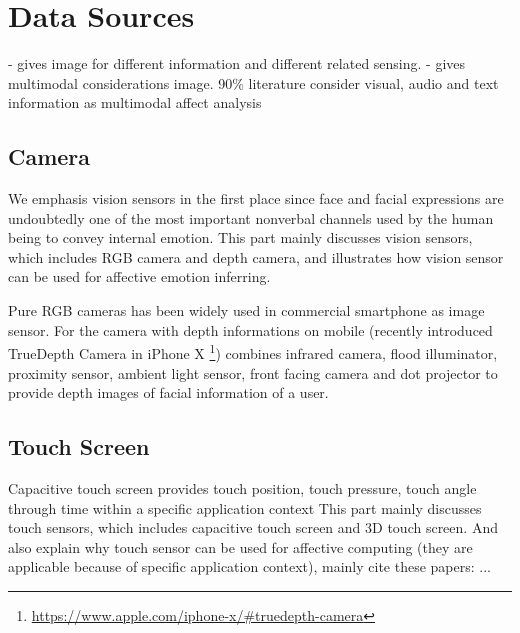 \section{Data Sources}\label{sec:source}

- \cite{Tao2005} gives image for different information and different related sensing.
- \cite{Poria2017} gives multimodal considerations image. 90\% literature consider visual, audio and text information as multimodal affect analysis

\subsection{Camera}\label{subsec:vision}
We emphasis vision sensors in the first place since face and facial expressions are undoubtedly one of the most important nonverbal channels used by the human being to convey internal emotion. This part mainly discusses vision sensors, which includes RGB camera and depth camera, and illustrates how vision sensor can be used for affective emotion inferring.

Pure RGB cameras has been widely used in commercial smartphone as image sensor. 
For the camera with depth informations on mobile (recently introduced TrueDepth Camera in iPhone X \footnote{\url{https://www.apple.com/iphone-x/\#truedepth-camera}}) combines infrared camera, flood illuminator, proximity sensor, ambient light sensor, front facing camera and dot projector to provide depth images of facial information of a user.

\cite{}


\subsection{Touch Screen}\label{subsec:touch}
Capacitive touch screen provides touch position, touch pressure, touch angle through time within a specific application context
\cite{Hertenstein2009, Gao2012, Shah2015, bhattacharya2017predictive}
This part mainly discusses touch sensors, which includes capacitive touch screen and 3D touch screen.
And also explain why touch sensor can be used for affective computing (they are applicable
because of specific application context), mainly cite these papers: ...

